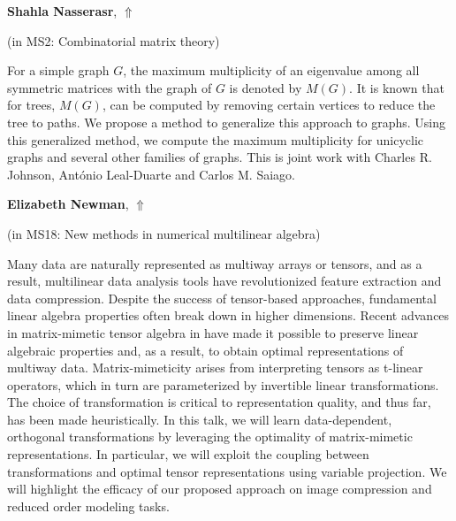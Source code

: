 \documentclass[ILAS2025-program.tex]{subfiles}
\begin{document}
\hypertarget{down0262}{}\begin{ilasabstract}
    
\textbf{Shahla Nasserasr},  \hfill \hyperlink{up0262}{$\Uparrow$}
    
    
(in {\color{mstitle}MS2: Combinatorial matrix theory})
        
\mtskip
    For a simple graph $G$, the maximum multiplicity of an eigenvalue among all symmetric matrices with the graph of $G$ is denoted by $M(G)$. It is known that for trees, $M(G)$, can be computed by removing certain vertices to reduce the tree to paths. We propose a method to generalize this approach to graphs. Using this generalized method, we compute the maximum multiplicity for unicyclic graphs and several other families of graphs.
This is joint work with Charles R. Johnson, Ant\'onio Leal-Duarte and Carlos M. Saiago.

\end{ilasabstract}
    

\hypertarget{down0039}{}\begin{ilasabstract}
    
\textbf{Elizabeth Newman},  \hfill \hyperlink{up0039}{$\Uparrow$}
    
    
(in {\color{mstitle}MS18: New methods in numerical multilinear algebra})
        
\mtskip
    Many data are naturally represented as multiway arrays or tensors, and as a result, multilinear data analysis tools have revolutionized feature extraction and data compression. Despite the success of tensor-based approaches, fundamental linear algebra properties often break down in higher dimensions. Recent advances in matrix-mimetic tensor algebra in have made it possible to preserve linear algebraic properties and, as a result, to obtain optimal representations of multiway data. Matrix-mimeticity arises from interpreting tensors as t-linear operators, which in turn are parameterized by invertible linear transformations. The choice of transformation is critical to representation quality, and thus far, has been made heuristically. In this talk, we will learn data-dependent, orthogonal transformations by leveraging the optimality of matrix-mimetic representations. In particular, we will exploit the coupling between transformations and optimal tensor representations using variable projection. We will highlight the efficacy of our proposed approach on image compression and reduced order modeling tasks.

\end{ilasabstract}
    
\end{document}
